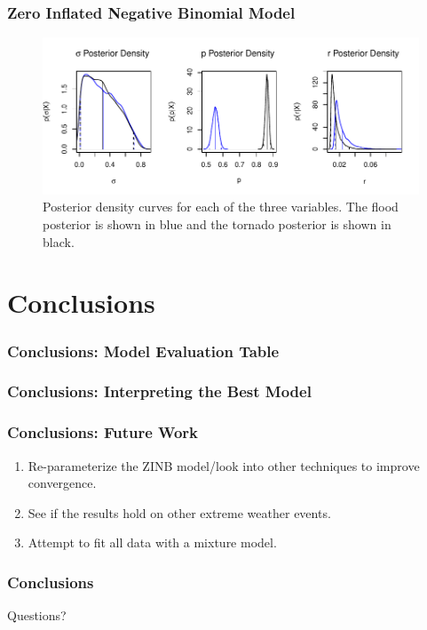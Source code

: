 \documentclass{beamer}
\begin{document}
	\begin{frame}
		\frametitle{Zero Inflated Negative Binomial Model}
		\begin{figure}[p]
			\centering
			\includegraphics[width=.9\textwidth]{figure/zinbdensity-1} 
			\caption{Posterior density curves for each of the three variables. The flood posterior is shown in blue and the tornado posterior is shown in black.}
		\end{figure} 
	\end{frame}
	
	\section{Conclusions}
	\begin{frame}
		\frametitle{Conclusions: Model Evaluation Table}
	\end{frame}
	\begin{frame}
		\frametitle{Conclusions: Interpreting the Best Model}
	\end{frame}
	\begin{frame}
		\frametitle{Conclusions: Future Work}
		\begin{enumerate}
			\item{Re-parameterize the ZINB model/look into other techniques to improve convergence.}
			\item{See if the results hold on other extreme weather events.}
			\item{Attempt to fit all data with a mixture model.}
		\end{enumerate}
	\end{frame}
	\begin{frame}
		\frametitle{Conclusions}
		Questions?
	\end{frame}
	
\end{document}
